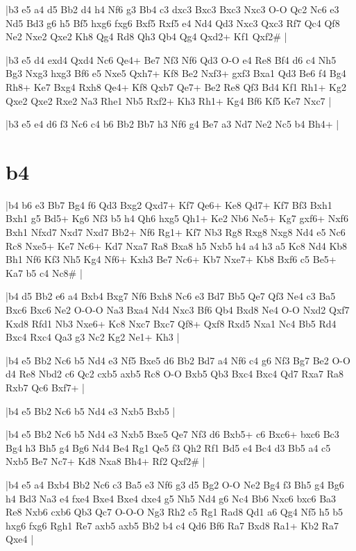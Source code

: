 \whitename{}
\blackname{}
\makegametitle
|b3 e5 a4 d5 Bb2 d4 h4 Nf6 g3 Bb4 c3 dxc3 Bxc3 Bxc3 Nxc3 O-O Qc2 Nc6 e3 Nd5 Bd3 g6 h5 Bf5 hxg6 fxg6 Bxf5 Rxf5 e4 Nd4 Qd3 Nxc3 Qxc3 Rf7 Qc4 Qf8 Ne2 Nxe2 Qxe2 Kh8 Qg4 Rd8 Qh3 Qb4 Qg4 Qxd2+ Kf1 Qxf2\#  |

\whitename{}
\blackname{}
\makegametitle
|b3 e5 d4 exd4 Qxd4 Nc6 Qe4+ Be7 Nf3 Nf6 Qd3 O-O e4 Re8 Bf4 d6 c4 Nh5 Bg3 Nxg3 hxg3 Bf6 e5 Nxe5 Qxh7+ Kf8 Be2 Nxf3+ gxf3 Bxa1 Qd3 Be6 f4 Bg4 Rh8+ Ke7 Bxg4 Rxh8 Qe4+ Kf8 Qxb7 Qe7+ Be2 Re8 Qf3 Bd4 Kf1 Rh1+ Kg2 Qxe2 Qxe2 Rxe2 Na3 Rhe1 Nb5 Rxf2+ Kh3 Rh1+ Kg4 Bf6 Kf5 Ke7 Nxc7  |

\whitename{}
\blackname{}
\makegametitle
|b3 e5 e4 d6 f3 Nc6 c4 b6 Bb2 Bb7 h3 Nf6 g4 Be7 a3 Nd7 Ne2 Nc5 b4 Bh4+  |

\section{b4}

\whitename{}
\blackname{}
\makegametitle
|b4 b6 e3 Bb7 Bg4 f6 Qd3 Bxg2 Qxd7+ Kf7 Qe6+ Ke8 Qd7+ Kf7 Bf3 Bxh1 Bxh1 g5 Bd5+ Kg6 Nf3 b5 h4 Qh6 hxg5 Qh1+ Ke2 Nb6 Ne5+ Kg7 gxf6+ Nxf6 Bxh1 Nfxd7 Nxd7 Nxd7 Bb2+ Nf6 Rg1+ Kf7 Nb3 Rg8 Rxg8 Nxg8 Nd4 e5 Nc6 Rc8 Nxe5+ Ke7 Nc6+ Kd7 Nxa7 Ra8 Bxa8 h5 Nxb5 h4 a4 h3 a5 Kc8 Nd4 Kb8 Bh1 Nf6 Kf3 Nh5 Kg4 Nf6+ Kxh3 Be7 Nc6+ Kb7 Nxe7+ Kb8 Bxf6 c5 Be5+ Ka7 b5 c4 Nc8\#  |

\whitename{}
\blackname{}
\makegametitle
|b4 d5 Bb2 e6 a4 Bxb4 Bxg7 Nf6 Bxh8 Nc6 e3 Bd7 Bb5 Qe7 Qf3 Ne4 c3 Ba5 Bxc6 Bxc6 Ne2 O-O-O Na3 Bxa4 Nd4 Nxc3 Bf6 Qb4 Bxd8 Ne4 O-O Nxd2 Qxf7 Kxd8 Rfd1 Nb3 Nxe6+ Kc8 Nxc7 Bxc7 Qf8+ Qxf8 Rxd5 Nxa1 Nc4 Bb5 Rd4 Bxc4 Rxc4 Qa3 g3 Nc2 Kg2 Ne1+ Kh3  |

\whitename{}
\blackname{}
\makegametitle
|b4 e5 Bb2 Nc6 b5 Nd4 e3 Nf5 Bxe5 d6 Bb2 Bd7 a4 Nf6 c4 g6 Nf3 Bg7 Be2 O-O d4 Re8 Nbd2 c6 Qc2 cxb5 axb5 Rc8 O-O Bxb5 Qb3 Bxc4 Bxc4 Qd7 Rxa7 Ra8 Rxb7 Qc6 Bxf7+  |

\whitename{}
\blackname{}
\makegametitle
|b4 e5 Bb2 Nc6 b5 Nd4 e3 Nxb5 Bxb5  |

\whitename{}
\blackname{}
\makegametitle
|b4 e5 Bb2 Nc6 b5 Nd4 e3 Nxb5 Bxe5 Qe7 Nf3 d6 Bxb5+ c6 Bxc6+ bxc6 Bc3 Bg4 h3 Bh5 g4 Bg6 Nd4 Be4 Rg1 Qe5 f3 Qh2 Rf1 Bd5 e4 Bc4 d3 Bb5 a4 c5 Nxb5 Be7 Nc7+ Kd8 Nxa8 Bh4+ Rf2 Qxf2\#  |

\whitename{}
\blackname{}
\makegametitle
|b4 e5 a4 Bxb4 Bb2 Nc6 c3 Ba5 e3 Nf6 g3 d5 Bg2 O-O Ne2 Bg4 f3 Bh5 g4 Bg6 h4 Bd3 Na3 e4 fxe4 Bxe4 Bxe4 dxe4 g5 Nh5 Nd4 g6 Nc4 Bb6 Nxc6 bxc6 Ba3 Re8 Nxb6 cxb6 Qb3 Qc7 O-O-O Ng3 Rh2 c5 Rg1 Rad8 Qd1 a6 Qg4 Nf5 h5 b5 hxg6 fxg6 Rgh1 Re7 axb5 axb5 Bb2 b4 c4 Qd6 Bf6 Ra7 Bxd8 Ra1+ Kb2 Ra7 Qxe4  |

